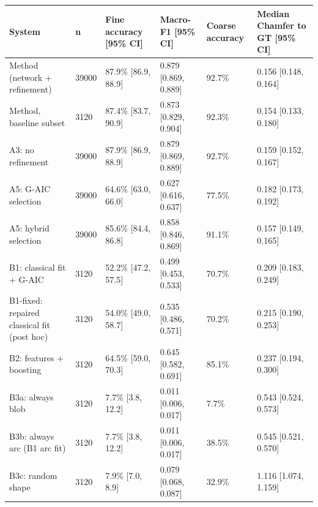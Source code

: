 \scriptsize
\begin{tabular}{llllll}
\toprule
\textbf{System} & \textbf{n} & \textbf{Fine accuracy [95\% CI]} & \textbf{Macro-F1 [95\% CI]} & \textbf{Coarse accuracy} & \textbf{Median Chamfer to GT [95\% CI]} \\
\midrule
Method (network + refinement) & 39000 & 87.9\% [86.9, 88.9] & 0.879 [0.869, 0.889] & 92.7\% & 0.156 [0.148, 0.164] \\
Method, baseline subset & 3120 & 87.4\% [83.7, 90.9] & 0.873 [0.829, 0.904] & 92.3\% & 0.154 [0.133, 0.180] \\
A3: no refinement & 39000 & 87.9\% [86.9, 88.9] & 0.879 [0.869, 0.889] & 92.7\% & 0.159 [0.152, 0.167] \\
A5: G-AIC selection & 39000 & 64.6\% [63.0, 66.0] & 0.627 [0.616, 0.637] & 77.5\% & 0.182 [0.173, 0.192] \\
A5: hybrid selection & 39000 & 85.6\% [84.4, 86.8] & 0.858 [0.846, 0.869] & 91.1\% & 0.157 [0.149, 0.165] \\
B1: classical fit + G-AIC & 3120 & 52.2\% [47.2, 57.5] & 0.499 [0.453, 0.533] & 70.7\% & 0.209 [0.183, 0.249] \\
B1-fixed: repaired classical fit (post hoc) & 3120 & 54.0\% [49.0, 58.7] & 0.535 [0.486, 0.571] & 70.2\% & 0.215 [0.190, 0.253] \\
B2: features + boosting & 3120 & 64.5\% [59.0, 70.3] & 0.645 [0.582, 0.691] & 85.1\% & 0.237 [0.194, 0.300] \\
B3a: always blob & 3120 & 7.7\% [3.8, 12.2] & 0.011 [0.006, 0.017] & 7.7\% & 0.543 [0.524, 0.573] \\
B3b: always arc (B1 arc fit) & 3120 & 7.7\% [3.8, 12.2] & 0.011 [0.006, 0.017] & 38.5\% & 0.545 [0.521, 0.570] \\
B3c: random shape & 3120 & 7.9\% [7.0, 8.9] & 0.079 [0.068, 0.087] & 32.9\% & 1.116 [1.074, 1.159] \\
\bottomrule
\end{tabular}
